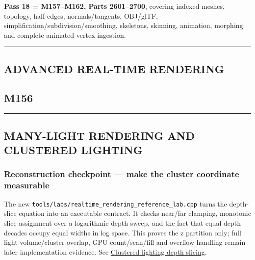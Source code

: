 \textbf{Pass 18 = M157--M162, Parts 2601--2700}, covering indexed meshes, topology, half-edges, normals/tangents, OBJ/glTF, simplification/subdivision/smoothing, skeletons, skinning, animation, morphing and complete animated-vertex ingestion.

\begin{center}\rule{0.5\linewidth}{0.5pt}\end{center}

\subsection{ADVANCED REAL-TIME RENDERING}\label{04-visual-computing-ii-ch040-advanced-real-time-rendering}

\hypertarget{04-visual-computing-ii-ch040-advanced-real-time-rendering}{}

\subsection{M156}\label{04-visual-computing-ii-ch040-m156}

\hypertarget{04-visual-computing-ii-ch040-m156}{}

\begin{center}\rule{0.5\linewidth}{0.5pt}\end{center}

\subsection{MANY-LIGHT RENDERING AND CLUSTERED LIGHTING}\label{04-visual-computing-ii-ch040-many-light-rendering-and-clustered-lighting}

\hypertarget{04-visual-computing-ii-ch040-many-light-rendering-and-clustered-lighting}{}

\subsubsection{Reconstruction checkpoint --- make the cluster coordinate measurable}\label{04-visual-computing-ii-ch040-reconstruction-checkpoint-make-the-cluster-coordinate-measurable}

\hypertarget{04-visual-computing-ii-ch040-reconstruction-checkpoint-make-the-cluster-coordinate-measurable}{}

The new \texttt{tools/labs/realtime\_rendering\_reference\_lab.cpp} turns the depth-slice equation into an executable contract. It checks near/far clamping, monotonic slice assignment over a logarithmic depth sweep, and the fact that equal depth decades occupy equal widths in log space. This proves the z partition only; full light-volume/cluster overlap, GPU count/scan/fill and overflow handling remain later implementation evidence. See \hyperref[appendix-b0efeb3f3648]{Clustered lighting depth slicing}.

